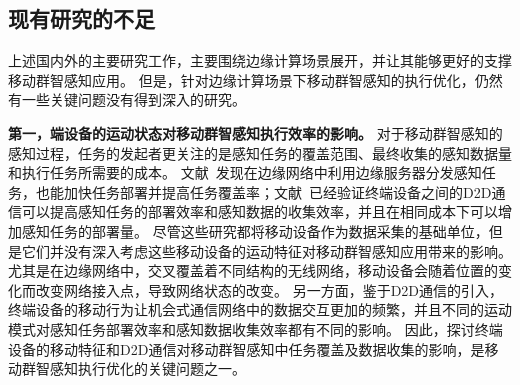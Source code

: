 

\subsection{现有研究的不足}


上述国内外的主要研究工作，主要围绕边缘计算场景展开，并让其能够更好的支撑移动群智感知应用。
但是，针对边缘计算场景下移动群智感知的执行优化，仍然有一些关键问题没有得到深入的研究。


\textbf{第一，端设备的运动状态对移动群智感知执行效率的影响。}
对于移动群智感知的感知过程，任务的发起者更关注的是感知任务的覆盖范围、最终收集的感知数据量和执行任务所需要的成本。
文献~发现在边缘网络中利用边缘服务器分发感知任务，也能加快任务部署并提高任务覆盖率；文献~已经验证终端设备之间的D2D通信可以提高感知任务的部署效率和感知数据的收集效率，并且在相同成本下可以增加感知任务的部署量。
尽管这些研究都将移动设备作为数据采集的基础单位，但是它们并没有深入考虑这些移动设备的运动特征对移动群智感知应用带来的影响。
尤其是在边缘网络中，交叉覆盖着不同结构的无线网络，移动设备会随着位置的变化而改变网络接入点，导致网络状态的改变。
另一方面，鉴于D2D通信的引入，终端设备的移动行为让机会式通信网络中的数据交互更加的频繁，并且不同的运动模式对感知任务部署效率和感知数据收集效率都有不同的影响。
因此，探讨终端设备的移动特征和D2D通信对移动群智感知中任务覆盖及数据收集的影响，是移动群智感知执行优化的关键问题之一。


